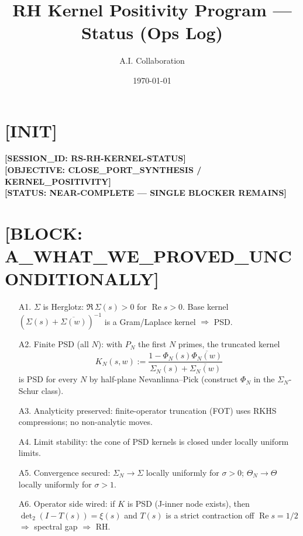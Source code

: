 \documentclass[11pt]{article}
\title{RH Kernel Positivity Program — Status (Ops Log)}
\author{A.I. Collaboration}
\date{\today}
\newcommand{\ReS}{\operatorname{Re}}
\newcommand{\Si}{\Sigma}
\newcommand{\SiN}{\Sigma_N}
\newcommand{\Th}{\Theta}
\newcommand{\ThN}{\Theta_N}
\newcommand{\detTwo}{\det\nolimits_{2}}
\begin{document}
\maketitle

\section*{[INIT]}
\textbf{[SESSION\_ID: RS-RH-KERNEL-STATUS]}\\
\textbf{[OBJECTIVE: CLOSE\_PORT\_SYNTHESIS / KERNEL\_POSITIVITY]}\\
\textbf{[STATUS: NEAR-COMPLETE — SINGLE BLOCKER REMAINS]}

\section*{[BLOCK: A\_WHAT\_WE\_PROVED\_UNCONDITIONALLY]}
\begin{itemize}
  \item[A1.] $\Si$ is Herglotz: $\Re\,\Si(s)>0$ for $\ReS s>0$. Base kernel $(\Si(s)+\overline{\Si(w)})^{-1}$ is a Gram/Laplace kernel $\Rightarrow$ PSD.
  \item[A2.] Finite PSD (all $N$): with $P_N$ the first $N$ primes, the truncated kernel
  \[
    K_N(s,w):=\frac{1-\Phi_N(s)\overline{\Phi_N(w)}}{\SiN(s)+\overline{\SiN(w)}}
  \]
  is PSD for every $N$ by half-plane Nevanlinna--Pick (construct $\Phi_N$ in the $\SiN$-Schur class).
  \item[A3.] Analyticity preserved: finite-operator truncation (FOT) uses RKHS compressions; no non-analytic moves.
  \item[A4.] Limit stability: the cone of PSD kernels is closed under locally uniform limits.
  \item[A5.] Convergence secured: $\SiN\to\Si$ locally uniformly for $\sigma>0$; $\ThN\to\Th$ locally uniformly for $\sigma>1$.
  \item[A6.] Operator side wired: if $K$ is PSD (J-inner node exists), then $\detTwo(I-T(s))=\xi(s)$ and $T(s)$ is a strict contraction off $\ReS s=1/2$ $\Rightarrow$ spectral gap $\Rightarrow$ RH.
\end{itemize}
\end{document}

